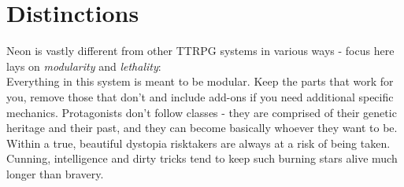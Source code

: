 \documentclass[12pt,a4paper,openany,usenames,dvipsnames]{book}
\begin{document}
	

	\chapter{Distinctions}
	Neon is vastly different from other TTRPG systems in various ways - focus here lays on \emph{modularity} and \emph{lethality}:\\
	Everything in this system is meant to be modular.
	Keep the parts that work for you,
		remove those that don't
		and include add-ons if you need additional specific mechanics.
	Protagonists don't follow classes
		- they are comprised of their genetic heritage and their past,
		and they can become basically whoever they want to be.
	Within a true, beautiful dystopia risktakers are always at a risk of being taken.
	Cunning, intelligence and dirty tricks tend to keep such burning stars alive much longer than bravery.
\end{document}
